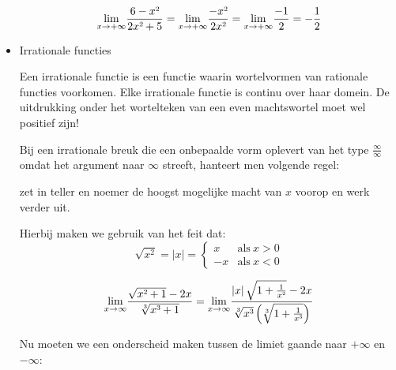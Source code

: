 \begin{itemize}
\begin{voorbeeld}
\begin{equation*}
{\displaystyle \lim_{x\to+\infty}}{\displaystyle \frac{6-x\text{\texttwosuperior}}{2x\text{\texttwosuperior}+5}}={\displaystyle \lim_{x\to+\infty}}{\displaystyle \frac{-x\text{\texttwosuperior}}{2x\text{\texttwosuperior}}}={\displaystyle \lim_{x\to+\infty}}{\displaystyle \frac{-1}{2}}={\displaystyle -\frac{1}{2}}
\end{equation*}

\end{voorbeeld}




\item{Irrationale functies}

Een irrationale functie is een functie waarin wortelvormen van rationale
functies voorkomen. Elke irrationale functie is continu over haar
domein. De uitdrukking onder het wortelteken van een even machtswortel
moet wel positief zijn!

Bij een irrationale breuk die een onbepaalde vorm oplevert
van het type $\frac{\infty}{\infty}$ omdat het argument naar $\infty$
streeft, hanteert men volgende regel:

zet in teller en noemer de hoogst mogelijke macht van $x$ voorop
en werk verder uit.

Hierbij maken we gebruik van het feit dat: 
\begin{equation*}
\sqrt{x^{2}}=\left|x\right|=\begin{cases}
x & \mathrm{als}\:x>0\\
-x & \mathrm{als}\:x<0
\end{cases}
\end{equation*}


\begin{voorbeeld}
	\begin{equation*}
	{\displaystyle {\displaystyle \lim_{x\to\infty}}\frac{\sqrt{x\text{\texttwosuperior}+1}-2x}{\sqrt[3]{x\text{\textthreesuperior}+1}}={\displaystyle \lim_{x\to\infty}}\frac{\left|x\right|\sqrt{1+\frac{1}{x\text{\texttwosuperior}}}-2x}{\sqrt[3]{x\text{\textthreesuperior}}\left(\sqrt[3]{1+\frac{1}{x\text{\textthreesuperior}}}\right)}}
	\end{equation*}

Nu moeten we een onderscheid maken tussen de limiet gaande naar $+\infty$
en $-\infty$:


\end{voorbeeld}
\end{itemize}
